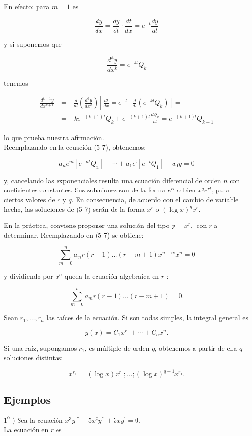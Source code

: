\documentclass[10pt]{article}
\theoremstyle{plain}
\theoremstyle{definition}
\theoremstyle{remark}
\begin{document}
En efecto: para $m=1$ es

$$
\frac{d y}{d x}=\frac{d y}{d t} \cdot \frac{d t}{d x}=e^{-t} \frac{d y}{d t}
$$

y si suponemos que

$$
\frac{d^{k} y}{d x^{k}}=e^{-k t} Q_{k}
$$

tenemos

$$
\begin{aligned}
\frac{d^{k+1} y}{d x^{k+1}} & =\left[\frac{d}{d t}\left(\frac{d^{k} y}{d x^{k}}\right)\right] \frac{d t}{d x}=e^{-t}\left[\frac{d}{d t}\left(e^{-k t} Q_{k}\right)\right]= \\
& =-k e^{-(k+1) t} Q_{k}+e^{-(k+1) t} \frac{d Q_{k}}{d t}=e^{-(k+1) t} Q_{k+1}
\end{aligned}
$$

lo que prueba nuestra afirmación.\\
Reemplazando en la ecuación (5-7), obtenemos:

$$
a_{n} e^{n t}\left[e^{-n t} Q_{n}\right]+\cdots+a_{1} e^{t}\left[e^{-t} Q_{1}\right]+a_{0} y=0
$$

y, cancelando las exponenciales resulta una ecuación diferencial de orden $n$ con coeficientes constantes. Sus soluciones son de la forma $e^{r t}$ o bien $x^{q} e^{r t}$, para ciertos valores de $r$ y $q$. En consecuencia, de acuerdo con el cambio de variable hecho, las soluciones de (5-7) serán de la forma $x^{r}$ o $(\log x)^{q} x^{r}$.

En la práctica, conviene proponer una solución del tipo $y=x^{r}$, $\operatorname{con} r$ a determinar. Reemplazando en (5-7) se obtiene:

$$
\sum_{m=0}^{n} a_{m} r(r-1) \ldots(r-m+1) x^{n-m} x^{n}=0
$$

y dividiendo por $x^{n}$ queda la ecuación algebraica en $r$ :

$$
\sum_{m=0}^{n} a_{m} r(r-1) \ldots(r-m+1)=0 .
$$

Sean $r_{1}, \ldots, r_{n}$ las raíces de la ecuación. Si son todas simples, la integral general es

$$
y(x)=C_{1} x^{r_{1}}+\cdots+C_{n} x^{n} .
$$


Si una raíz, supongamos $r_{1}$, es múltiple de orden $q$, obtenemos a partir de ella $q$ soluciones distintas:

$$
x^{r_{1}} ; \quad(\log x) x^{r_{1}} ; \ldots ;(\log x)^{q-1} x^{r_{1}} .
$$

\subsection{Ejemplos}
$1^{0}$ ) Sea la ecuación $x^{3} y^{\prime \prime \prime}+5 x^{2} y^{\prime \prime}+3 x y^{\prime}=0$.\\
La ecuación en $r$ es
\end{document}
